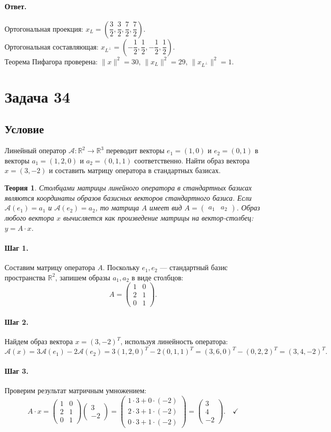 \documentclass[12pt,a4paper]{article}
\theoremstyle{solution}
\newtheorem*{theory}{Теория}
\newcommand{\task}[1]{\newpage\section*{Задача #1}}
\newcommand{\answer}{\paragraph{Ответ.}}
\newcommand{\step}[1]{\paragraph{Шаг #1.}}
\newcommand{\R}{\mathbb{R}}
\begin{document}
\answer
Ортогональная проекция: $x_L = \left(\dfrac{3}{2}, \dfrac{3}{2}, \dfrac{7}{2}, \dfrac{7}{2}\right)$. \\
Ортогональная составляющая: $x_{L^\perp} = \left(-\dfrac{1}{2}, \dfrac{1}{2}, -\dfrac{1}{2}, \dfrac{1}{2}\right)$. \\
Теорема Пифагора проверена: $\|x\|^2 = 30$, $\|x_L\|^2 = 29$, $\|x_{L^\perp}\|^2 = 1$.

\task{34}
\subsection*{Условие}
Линейный оператор $\mathcal{A} : \mathbb{R}^2 \to \mathbb{R}^3$ переводит векторы $e_1 = (1, 0)$ и $e_2 = (0, 1)$ в векторы $a_1 = (1, 2, 0)$ и $a_2 = (0, 1, 1)$ соответственно. Найти образ вектора $x = (3, -2)$ и составить матрицу оператора в стандартных базисах.

\begin{theory}
Столбцами матрицы линейного оператора в стандартных базисах являются координаты образов базисных векторов стандартного базиса. Если $\mathcal{A}(e_1) = a_1$ и $\mathcal{A}(e_2) = a_2$, то матрица $A$ имеет вид $A = \begin{pmatrix} a_1 & a_2 \end{pmatrix}$. Образ любого вектора $x$ вычисляется как произведение матрицы на вектор-столбец: $y = A \cdot x$.
\end{theory}

\step{1} Составим матрицу оператора $A$. Поскольку $e_1, e_2$ — стандартный базис пространства $\R^2$, запишем образы $a_1, a_2$ в виде столбцов:
\[
A = \begin{pmatrix} 1 & 0 \\ 2 & 1 \\ 0 & 1 \end{pmatrix}.
\]

\step{2} Найдем образ вектора $x = (3, -2)^T$, используя линейность оператора:
\[
\mathcal{A}(x) = 3\mathcal{A}(e_1) - 2\mathcal{A}(e_2) = 3(1, 2, 0)^T - 2(0, 1, 1)^T = (3, 6, 0)^T - (0, 2, 2)^T = (3, 4, -2)^T.
\]

\step{3} Проверим результат матричным умножением:
\[
A \cdot x = \begin{pmatrix} 1 & 0 \\ 2 & 1 \\ 0 & 1 \end{pmatrix} \begin{pmatrix} 3 \\ -2 \end{pmatrix} = \begin{pmatrix} 1\cdot 3 + 0\cdot(-2) \\ 2\cdot 3 + 1\cdot(-2) \\ 0\cdot 3 + 1\cdot(-2) \end{pmatrix} = \begin{pmatrix} 3 \\ 4 \\ -2 \end{pmatrix}. \quad\checkmark
\]
\end{document}
